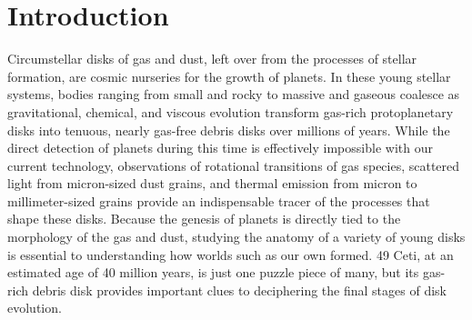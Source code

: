 \chapter{Introduction}

Circumstellar disks of gas and dust, left over from the processes of stellar formation, are cosmic nurseries for the growth of planets. In these young stellar systems, bodies ranging from small and rocky to massive and gaseous coalesce as gravitational, chemical, and viscous evolution transform gas-rich protoplanetary disks into tenuous, nearly gas-free debris disks over millions of years. While the direct detection of planets during this time is effectively impossible with our current technology, observations of rotational transitions of gas species, scattered light from micron-sized dust grains, and thermal emission from micron to millimeter-sized grains provide an indispensable tracer of the processes that shape these disks. Because the genesis of planets is directly tied to the morphology of the gas and dust, studying the anatomy of a variety of young disks is essential to understanding how worlds such as our own formed. 49 Ceti, at an estimated age of 40 million years, is just one puzzle piece of many, but its gas-rich debris disk provides important clues to deciphering the final stages of disk evolution. 





